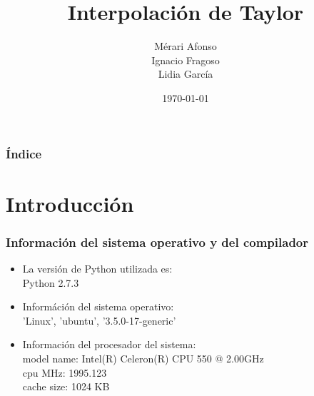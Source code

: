 \documentclass{beamer}
\title[Título]{Interpolación de Taylor}
\author[Autores]{Mérari Afonso\\
				 Ignacio Fragoso\\
                 Lidia García}
\date{\today}
\begin{document}
  
\begin{frame} %
\maketitle

  \begin{scriptsize}
    \begin{center}
     
    \end{center}
  \end{scriptsize}

\end{frame}

\begin{frame}
  \frametitle{Índice}  
  \tableofcontents[pausesections]
\end{frame}

\section{Introducción} 
\begin{frame}
  \frametitle{Información del sistema operativo y del compilador}
	\begin{itemize}
	   \item La versión de Python utilizada es:\\	
		Python 2.7.3 \\ 
	   \item Információn del sistema operativo: \\
		'Linux', 'ubuntu', '3.5.0-17-generic'
	   \item Información del procesador del sistema:\\
		model name: Intel(R) Celeron(R) CPU  550  @ 2.00GHz\\
		cpu MHz: 1995.123\\
		cache size: 1024 KB\\
	\end{itemize}
\end{frame}

\end{document}
